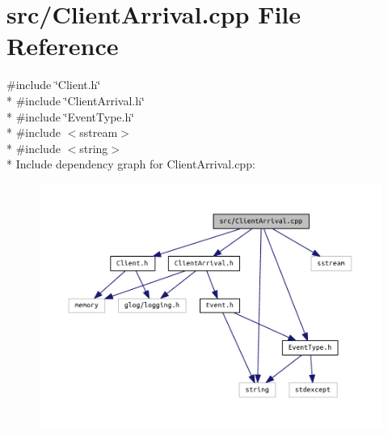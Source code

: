\section{src/\+Client\+Arrival.cpp File Reference}
\label{_client_arrival_8cpp}
{\ttfamily \#include \char`\"{}Client.\+h\char`\"{}}\\*
{\ttfamily \#include \char`\"{}Client\+Arrival.\+h\char`\"{}}\\*
{\ttfamily \#include \char`\"{}Event\+Type.\+h\char`\"{}}\\*
{\ttfamily \#include $<$sstream$>$}\\*
{\ttfamily \#include $<$string$>$}\\*
Include dependency graph for Client\+Arrival.\+cpp\+:\nopagebreak
\begin{figure}[H]
\begin{center}
\leavevmode
\includegraphics[width=350pt]{_client_arrival_8cpp__incl}
\end{center}
\end{figure}
